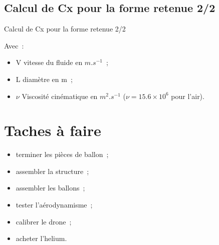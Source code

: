 \documentclass{beamer}
\begin{document}
\subsection{Calcul de Cx pour la forme retenue 2/2}
\begin{frame}{Calcul de Cx pour la forme retenue 2/2}
 \begin{center}
 \end{center}
 Avec~: \\
 \begin{itemize}
  \item V vitesse du fluide en $m.s^{-1}$~;
  \item L diamètre en m~;
  \item $\nu$ Viscosité cinématique en $m^2.s^{-1}$ ($\nu = 15.6 \times 10^6$ pour l'air).
 \end{itemize} 
\end{frame}

\section{Taches à faire}
\begin{frame}
  \begin{itemize}
    \item terminer les pièces de ballon~;
    \item assembler la structure~;
    \item assembler les ballons~;
    \item tester l'aérodynamisme~;
    \item calibrer le drone~;
    \item acheter l'helium.
  \end{itemize}
\end{frame}
\end{document}
